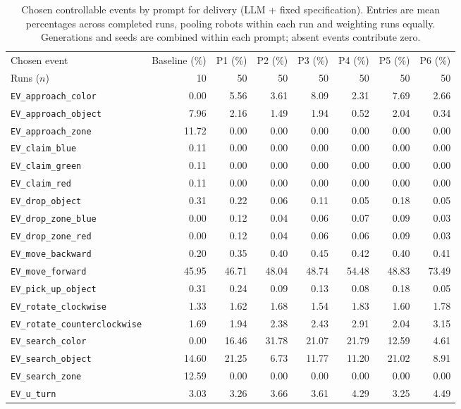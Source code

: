 \begin{table}[htbp]
\centering
\small
\caption{Chosen controllable events by prompt for delivery (LLM + fixed specification). Entries are mean percentages across completed runs, pooling robots within each run and weighting runs equally. Generations and seeds are combined within each prompt; absent events contribute zero.}
\label{tab:delivery-with-fixed-spec-prompt-events}
\begin{tabular}{lrrrrrrr}
\hline
Chosen event & Baseline (\%) & P1 (\%) & P2 (\%) & P3 (\%) & P4 (\%) & P5 (\%) & P6 (\%) \\
Runs ($n$) & 10 & 50 & 50 & 50 & 50 & 50 & 50 \\
\hline
\texttt{EV\_approach\_color} & 0.00 & 5.56 & 3.61 & 8.09 & 2.31 & 7.69 & 2.66 \\
\texttt{EV\_approach\_object} & 7.96 & 2.16 & 1.49 & 1.94 & 0.52 & 2.04 & 0.34 \\
\texttt{EV\_approach\_zone} & 11.72 & 0.00 & 0.00 & 0.00 & 0.00 & 0.00 & 0.00 \\
\texttt{EV\_claim\_blue} & 0.11 & 0.00 & 0.00 & 0.00 & 0.00 & 0.00 & 0.00 \\
\texttt{EV\_claim\_green} & 0.11 & 0.00 & 0.00 & 0.00 & 0.00 & 0.00 & 0.00 \\
\texttt{EV\_claim\_red} & 0.11 & 0.00 & 0.00 & 0.00 & 0.00 & 0.00 & 0.00 \\
\texttt{EV\_drop\_object} & 0.31 & 0.22 & 0.06 & 0.11 & 0.05 & 0.18 & 0.05 \\
\texttt{EV\_drop\_zone\_blue} & 0.00 & 0.12 & 0.04 & 0.06 & 0.07 & 0.09 & 0.03 \\
\texttt{EV\_drop\_zone\_red} & 0.00 & 0.12 & 0.04 & 0.06 & 0.06 & 0.09 & 0.03 \\
\texttt{EV\_move\_backward} & 0.20 & 0.35 & 0.40 & 0.45 & 0.42 & 0.40 & 0.41 \\
\texttt{EV\_move\_forward} & 45.95 & 46.71 & 48.04 & 48.74 & 54.48 & 48.83 & 73.49 \\
\texttt{EV\_pick\_up\_object} & 0.31 & 0.24 & 0.09 & 0.13 & 0.08 & 0.18 & 0.05 \\
\texttt{EV\_rotate\_clockwise} & 1.33 & 1.62 & 1.68 & 1.54 & 1.83 & 1.60 & 1.78 \\
\texttt{EV\_rotate\_counterclockwise} & 1.69 & 1.94 & 2.38 & 2.43 & 2.91 & 2.04 & 3.15 \\
\texttt{EV\_search\_color} & 0.00 & 16.46 & 31.78 & 21.07 & 21.79 & 12.59 & 4.61 \\
\texttt{EV\_search\_object} & 14.60 & 21.25 & 6.73 & 11.77 & 11.20 & 21.02 & 8.91 \\
\texttt{EV\_search\_zone} & 12.59 & 0.00 & 0.00 & 0.00 & 0.00 & 0.00 & 0.00 \\
\texttt{EV\_u\_turn} & 3.03 & 3.26 & 3.66 & 3.61 & 4.29 & 3.25 & 4.49 \\
\hline
\end{tabular}
\end{table}

